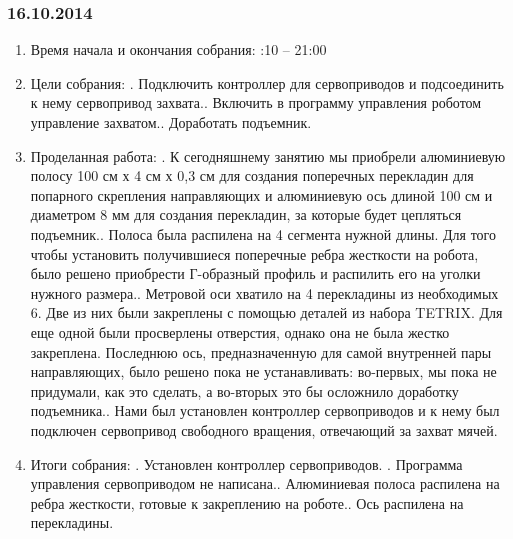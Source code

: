 \documentclass[11pt]{article}
\begin{document}
         \subsubsection{16.10.2014}
         \begin{enumerate}
            \item Время начала и окончания собрания:
            :10 – 21:00
            \item Цели собрания:
            .   Подключить контроллер для сервоприводов и подсоединить к нему сервопривод захвата..   Включить в программу управления роботом управление захватом..   Доработать подъемник.
            
            \item Проделанная работа:
            .   К сегодняшнему занятию мы приобрели алюминиевую полосу 100 см х 4 см х 0,3 см для создания поперечных перекладин для попарного скрепления направляющих и алюминиевую ось длиной 100 см и диаметром 8 мм для создания перекладин, за которые будет цепляться подъемник..   Полоса была распилена на 4 сегмента нужной длины. Для того чтобы установить получившиеся поперечные ребра жесткости на робота, было решено приобрести Г-образный профиль и распилить его на уголки нужного размера..   Метровой оси хватило на 4 перекладины из необходимых 6. Две из них были закреплены с помощью деталей из набора TETRIX. Для еще одной были просверлены отверстия, однако она не была жестко закреплена. Последнюю ось, предназначенную для самой внутренней пары направляющих, было решено пока не устанавливать: во-первых, мы пока не придумали, как это сделать, а во-вторых это бы осложнило доработку подъемника..   Нами был установлен контроллер сервоприводов и к нему был подключен сервопривод свободного вращения, отвечающий за захват мячей.\newline

            \item Итоги собрания:
            .   Установлен контроллер сервоприводов.
            .   Программа управления сервоприводом не написана..   Алюминиевая полоса распилена на ребра жесткости, готовые к закреплению на роботе..   Ось распилена на перекладины.
            

\end{enumerate}
\end{document}
